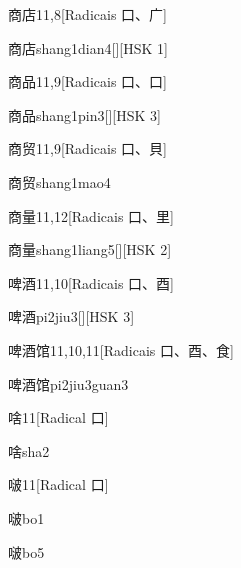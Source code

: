 \begin{entry}{商店}{11,8}[Radicais ⼝、⼴]
  \begin{phonetics}{商店}{shang1dian4}[][HSK 1]
  \end{phonetics}
\end{entry}

\begin{entry}{商品}{11,9}[Radicais ⼝、⼝]
  \begin{phonetics}{商品}{shang1pin3}[][HSK 3]
  \end{phonetics}
\end{entry}

\begin{entry}{商贸}{11,9}[Radicais ⼝、⾙]
  \begin{phonetics}{商贸}{shang1mao4}
  \end{phonetics}
\end{entry}

\begin{entry}{商量}{11,12}[Radicais ⼝、⾥]
  \begin{phonetics}{商量}{shang1liang5}[][HSK 2]
  \end{phonetics}
\end{entry}

\begin{entry}{啤酒}{11,10}[Radicais ⼝、⾣]
  \begin{phonetics}{啤酒}{pi2jiu3}[][HSK 3]
  \end{phonetics}
\end{entry}

\begin{entry}{啤酒馆}{11,10,11}[Radicais ⼝、⾣、⾷]
  \begin{phonetics}{啤酒馆}{pi2jiu3guan3}
  \end{phonetics}
\end{entry}

\begin{entry}{啥}{11}[Radical ⼝]
  \begin{phonetics}{啥}{sha2}
  \end{phonetics}
\end{entry}

\begin{entry}{啵}{11}[Radical ⼝]
  \begin{phonetics}{啵}{bo1}
  \end{phonetics}
  \begin{phonetics}{啵}{bo5}
  \end{phonetics}
\end{entry}

